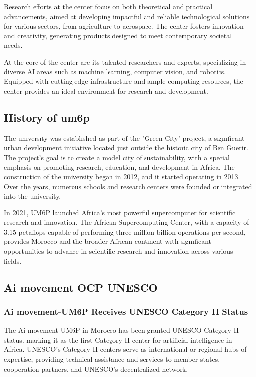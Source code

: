 Research efforts at the center focus on both theoretical and practical advancements, aimed at developing impactful and reliable technological solutions for various sectors, from agriculture to aerospace. The center fosters innovation and creativity, generating products designed to meet contemporary societal needs.

At the core of the center are its talented researchers and experts, specializing in diverse AI areas such as machine learning, computer vision, and robotics. Equipped with cutting-edge infrastructure and ample computing resources, the center provides an ideal environment for research and development.


\subsection{History of um6p}
The university was established as part of the "Green City" project, a significant urban development initiative located just outside the historic city of Ben Guerir. The project's goal is to create a model city of sustainability, with a special emphasis on promoting research, education, and development in Africa. The construction of the university began in 2012, and it started operating in 2013. Over the years, numerous schools and research centers were founded or integrated into the university.

In 2021, UM6P launched Africa's most powerful supercomputer for scientific research and innovation. The African Supercomputing Center, with a capacity of 3.15 petaflops capable of performing three million billion operations per second, provides Morocco and the broader African continent with significant opportunities to advance in scientific research and innovation across various fields.
\subsection{Ai movement OCP UNESCO}

\subsubsection{Ai movement-UM6P Receives UNESCO Category II Status}
The Ai movement-UM6P in Morocco has been granted UNESCO Category II status, marking it as the first Category II center for artificial intelligence in Africa. UNESCO's Category II centers serve as international or regional hubs of expertise, providing technical assistance and services to member states, cooperation partners, and UNESCO's decentralized network.

